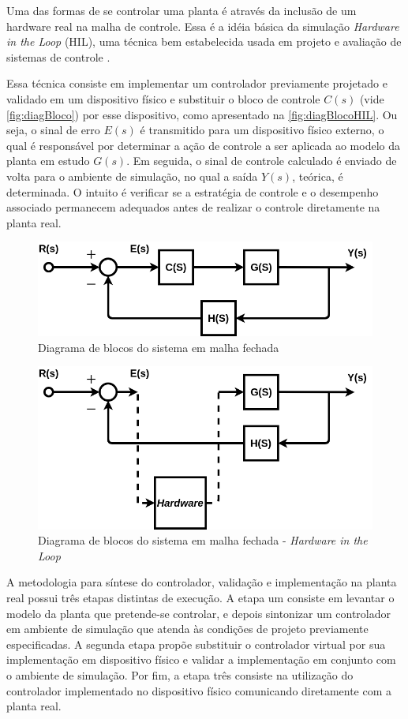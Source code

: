 Uma das formas de se controlar uma planta é através da inclusão de um hardware real na malha
de controle. Essa é a idéia básica da simulação \emph{Hardware in the Loop} (HIL), uma técnica
bem estabelecida usada em projeto e avaliação de sistemas de controle \cite{Bacic}.

Essa técnica consiste em implementar um controlador previamente projetado e validado em um dispositivo físico e 
substituir o bloco de controle $C(s)$ (vide \autoref{fig:diagBloco}) por esse dispositivo, como apresentado na 
\autoref{fig:diagBlocoHIL}. Ou seja, o sinal de erro $E(s)$ é transmitido para um dispositivo físico externo, 
o qual é responsável por determinar a ação de controle a ser aplicada ao modelo da planta em estudo $G(s)$. Em seguida, o 
sinal de controle calculado é enviado de volta para o ambiente de simulação, no qual a saída $Y(s)$, teórica, 
é determinada. O intuito é verificar se a estratégia de controle e o desempenho associado permanecem 
adequados antes de realizar o controle diretamente na planta real.

\begin{figure}[ht]
  \centering
  \includegraphics[width = 0.6\columnwidth]{Imagens/blocosMF.png}
  \caption{Diagrama de blocos do sistema em malha fechada}
  \label{fig:diagBloco} 
\end{figure}

\begin{figure}[ht]
  \centering
  \includegraphics[width = 0.7\columnwidth]{Imagens/blocoHard.png}
  \caption{Diagrama de blocos do sistema em malha fechada - \emph{Hardware in the Loop}}
  \label{fig:diagBlocoHIL} 
\end{figure}

A metodologia para síntese do controlador, validação e implementação na planta real possui
três etapas distintas de execução. A etapa um consiste em levantar o modelo da planta que 
pretende-se controlar, e depois sintonizar um controlador em ambiente de simulação que atenda
às condições de projeto previamente especificadas. A segunda etapa propõe substituir 
o controlador virtual por sua implementação em dispositivo físico e validar a implementação 
em conjunto com o ambiente de simulação. Por fim, a etapa três consiste na utilização do controlador
implementado no dispositivo físico comunicando diretamente com a planta real.

